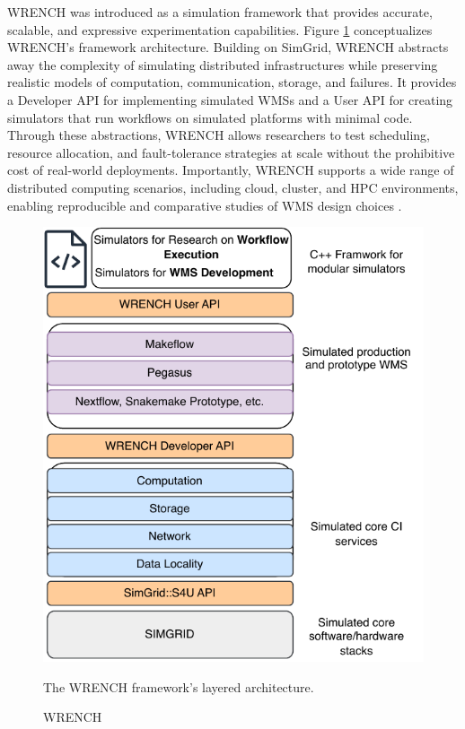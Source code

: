 WRENCH was introduced as a simulation framework that provides accurate, scalable, and expressive experimentation capabilities. Figure \ref{fig:02-wrench} conceptualizes WRENCH's framework architecture. Building on SimGrid, WRENCH abstracts away the complexity of simulating distributed infrastructures while preserving realistic models of computation, communication, storage, and failures. It provides a Developer API for implementing simulated WMSs and a User API for creating simulators that run workflows on simulated platforms with minimal code. Through these abstractions, WRENCH allows researchers to test scheduling, resource allocation, and fault-tolerance strategies at scale without the prohibitive cost of real-world deployments. Importantly, WRENCH supports a wide range of distributed computing scenarios, including cloud, cluster, and HPC environments, enabling reproducible and comparative studies of WMS design choices \cite{wrench}.

\begin{figure}[H]
    \centering
    \includegraphics[scale=0.7]{fig/02/02-wrench.pdf}
    \caption{WRENCH}
    \label{fig:02-wrench}
    \tiny
    The WRENCH framework's layered architecture.
\end{figure}





